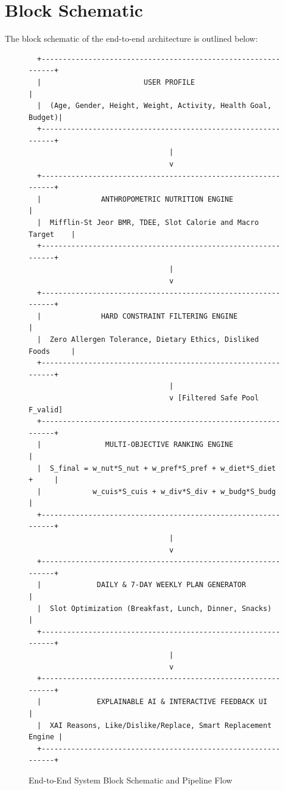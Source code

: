 \documentclass[12pt,a4paper]{report}
\begin{document}
\section{Block Schematic}
The block schematic of the end-to-end architecture is outlined below:

\begin{figure}[htbp]
\centering
\begin{lstlisting}
  +--------------------------------------------------------------+
  |                        USER PROFILE                          |
  |  (Age, Gender, Height, Weight, Activity, Health Goal, Budget)|
  +--------------------------------------------------------------+
                                 |
                                 v
  +--------------------------------------------------------------+
  |              ANTHROPOMETRIC NUTRITION ENGINE                 |
  |  Mifflin-St Jeor BMR, TDEE, Slot Calorie and Macro Target    |
  +--------------------------------------------------------------+
                                 |
                                 v
  +--------------------------------------------------------------+
  |              HARD CONSTRAINT FILTERING ENGINE                |
  |  Zero Allergen Tolerance, Dietary Ethics, Disliked Foods     |
  +--------------------------------------------------------------+
                                 |
                                 v [Filtered Safe Pool F_valid]
  +--------------------------------------------------------------+
  |               MULTI-OBJECTIVE RANKING ENGINE                 |
  |  S_final = w_nut*S_nut + w_pref*S_pref + w_diet*S_diet +     |
  |            w_cuis*S_cuis + w_div*S_div + w_budg*S_budg       |
  +--------------------------------------------------------------+
                                 |
                                 v
  +--------------------------------------------------------------+
  |             DAILY & 7-DAY WEEKLY PLAN GENERATOR              |
  |  Slot Optimization (Breakfast, Lunch, Dinner, Snacks)       |
  +--------------------------------------------------------------+
                                 |
                                 v
  +--------------------------------------------------------------+
  |             EXPLAINABLE AI & INTERACTIVE FEEDBACK UI         |
  |  XAI Reasons, Like/Dislike/Replace, Smart Replacement Engine |
  +--------------------------------------------------------------+
\end{lstlisting}
\caption{End-to-End System Block Schematic and Pipeline Flow}
\label{fig:block_schematic}
\end{figure}
\end{document}

